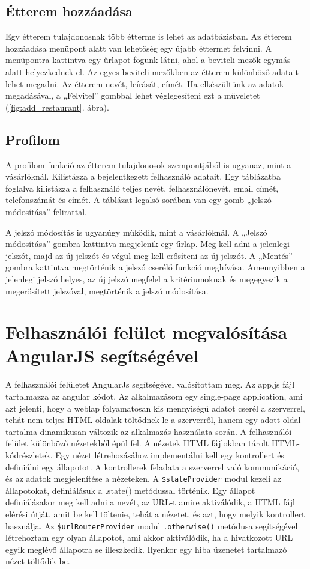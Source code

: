 \subsection{Étterem hozzáadása}

Egy étterem tulajdonosnak több étterme is lehet az adatbázisban. Az étterem hozzáadása menüpont alatt van lehetőség egy újabb éttermet felvinni. 
A menüpontra kattintva egy űrlapot fogunk látni, ahol a beviteli mezők egymás alatt helyezkednek el. Az egyes beviteli mezőkben az étterem különböző adatait lehet megadni. Az étterem nevét, leírását, címét. Ha elkészültünk az adatok megadásával, a „Felvitel” gombbal lehet véglegesíteni ezt a műveletet (\ref{fig:add_restaurant}. ábra).

\subsection{Profilom}

A profilom funkció az étterem tulajdonosok szempontjából is ugyanaz, mint a vásárlóknál. Kilistázza a bejelentkezett felhasználó adatait. Egy táblázatba foglalva kilistázza a felhasználó teljes nevét, felhasználónevét, email címét, telefonszámát és címét. A táblázat legalsó sorában van egy gomb „jelszó módosítása” felirattal.

A jelszó módosítás is ugyanúgy működik, mint a vásárlóknál. A „Jelszó módosítása” gombra kattintva megjelenik egy űrlap. Meg kell adni a jelenlegi jelszót, majd az új jelszót és végül meg kell erősíteni az új jelszót. A „Mentés” gombra kattintva megtörténik a jelszó cserélő funkció meghívása. Amennyibben a jelenlegi jelszó helyes, az új jelszó megfelel a kritériumoknak és megegyezik a megerősített jelszóval, megtörténik a jelszó módosítása.

\section{Felhasználói felület megvalósítása AngularJS segítségével}

A felhasználói felületet AngularJs segítségével valósítottam meg. Az app.js fájl tartalmazza az angular kódot. Az alkalmazásom egy single-page application, ami azt jelenti, hogy a weblap folyamatosan kis mennyiségű adatot cserél a szerverrel, tehát nem teljes HTML oldalak töltődnek le a szerverről, hanem egy adott oldal tartalma dinamikusan változik az alkalmazás használata során. A felhasználói felület különböző nézetekből épül fel. A nézetek HTML fájlokban tárolt HTML-kódrészletek. Egy nézet létrehozásához implementálni kell egy kontrollert és definiálni egy állapotot. A kontrollerek feladata a szerverrel való kommunikáció, és az adatok megjelenítése a nézeteken. A \texttt{\$stateProvider} modul kezeli az állapotokat, definiálásuk a .state() metódussal történik. Egy állapot definiálásakor meg kell adni a nevét, az URL-t amire aktiválódik, a HTML fájl elérési útját, amit be kell töltenie, tehát a nézetet, és azt, hogy melyik kontrollert használja. Az \texttt{\$urlRouterProvider} modul \texttt{.otherwise()} metódusa segítségével létrehoztam egy olyan állapotot, ami akkor aktiválódik, ha a hivatkozott URL egyik meglévő állapotra se illeszkedik. Ilyenkor egy hiba üzenetet tartalmazó nézet töltődik be.

